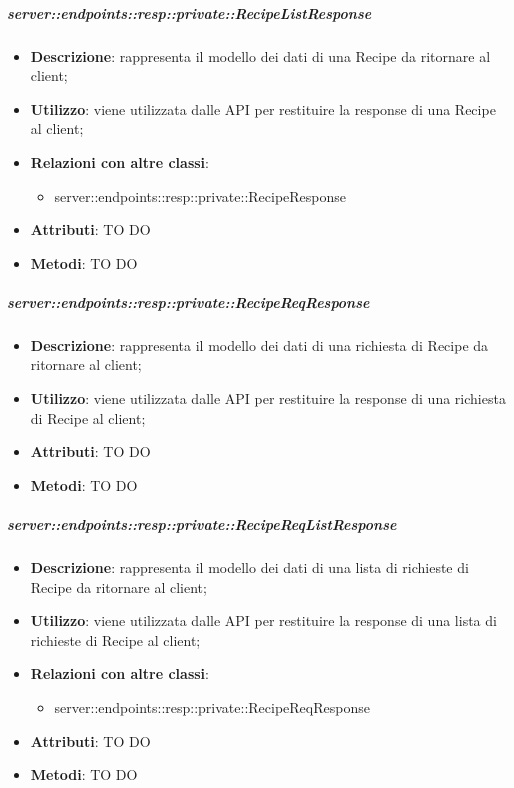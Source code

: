     \subparagraph{server::endpoints::resp::private::RecipeListResponse} %
    \label{subp:bdsm_app_server_endpoints_resp_private_recipelistresponse}
    \begin{itemize}
      \item \textbf{Descrizione}: rappresenta il modello dei dati di una Recipe da ritornare al client;
      \item \textbf{Utilizzo}: viene utilizzata dalle API per restituire la response di una Recipe al client;
      \item \textbf{Relazioni con altre classi}:
        \begin{itemize}
          \item server::endpoints::resp::private::RecipeResponse
        \end{itemize}
	  \item \textbf{Attributi}: TO DO
	  \item \textbf{Metodi}: TO DO
      \end{itemize}

    \subparagraph{server::endpoints::resp::private::RecipeReqResponse} %
    \label{subp:bdsm_app_server_endpoints_resp_private_recipereqresponse}
    \begin{itemize}
      \item \textbf{Descrizione}: rappresenta il modello dei dati di una richiesta di Recipe da ritornare al client;
      \item \textbf{Utilizzo}: viene utilizzata dalle API per restituire la response di una richiesta di Recipe al client;
	  \item \textbf{Attributi}: TO DO
	  \item \textbf{Metodi}: TO DO
      \end{itemize}

    \subparagraph{server::endpoints::resp::private::RecipeReqListResponse} %
    \label{subp:bdsm_app_server_endpoints_resp_private_recipereqlistresponse}
    \begin{itemize}
      \item \textbf{Descrizione}: rappresenta il modello dei dati di una lista di richieste di Recipe da ritornare al client;
      \item \textbf{Utilizzo}: viene utilizzata dalle API per restituire la response di una lista di richieste di Recipe al client;
      \item \textbf{Relazioni con altre classi}:
        \begin{itemize}
          \item server::endpoints::resp::private::RecipeReqResponse
        \end{itemize}
	  \item \textbf{Attributi}: TO DO
	  \item \textbf{Metodi}: TO DO
      \end{itemize}

